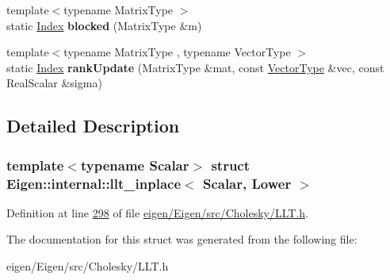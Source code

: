 \begin{DoxyCompactItemize}
{\footnotesize template$<$typename Matrix\+Type $>$ }\\static \hyperlink{namespace_eigen_a62e77e0933482dafde8fe197d9a2cfde}{Index} {\bfseries blocked} (Matrix\+Type \&m)
\item 
\mbox{\label{struct_eigen_1_1internal_1_1llt__inplace_3_01_scalar_00_01_lower_01_4_ae02f3e4d3e4abf21624333d43762dd81}} 
{\footnotesize template$<$typename Matrix\+Type , typename Vector\+Type $>$ }\\static \hyperlink{namespace_eigen_a62e77e0933482dafde8fe197d9a2cfde}{Index} {\bfseries rank\+Update} (Matrix\+Type \&mat, const \hyperlink{struct_vector_type}{Vector\+Type} \&vec, const Real\+Scalar \&sigma)
\end{DoxyCompactItemize}


\subsection{Detailed Description}
\subsubsection*{template$<$typename Scalar$>$\newline
struct Eigen\+::internal\+::llt\+\_\+inplace$<$ Scalar, Lower $>$}



Definition at line \hyperlink{eigen_2_eigen_2src_2_cholesky_2_l_l_t_8h_source_l00298}{298} of file \hyperlink{eigen_2_eigen_2src_2_cholesky_2_l_l_t_8h_source}{eigen/\+Eigen/src/\+Cholesky/\+L\+L\+T.\+h}.



The documentation for this struct was generated from the following file\+:\begin{DoxyCompactItemize}
\item 
eigen/\+Eigen/src/\+Cholesky/\+L\+L\+T.\+h\end{DoxyCompactItemize}

